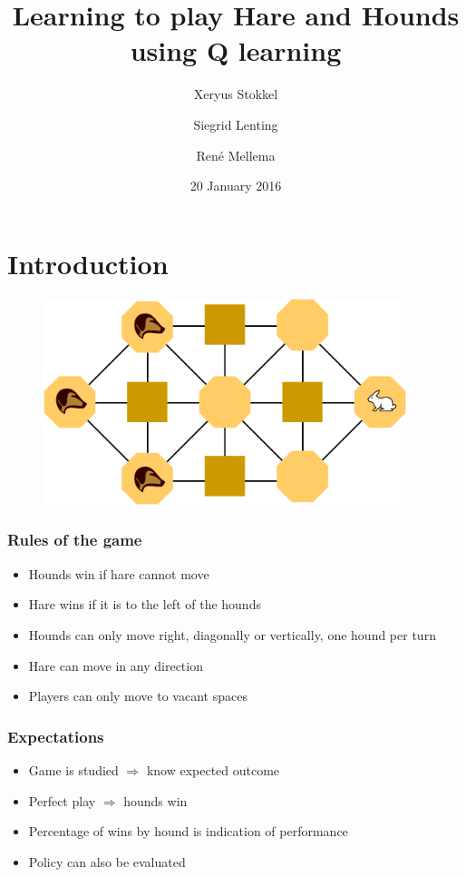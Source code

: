 \documentclass{beamer}
\title{Learning to play Hare and Hounds using Q learning}
\author{Xeryus Stokkel \and Siegrid Lenting \and Ren\'e Mellema}
\date{20 January 2016}
\begin{document}
\begin{frame}
    \maketitle
\end{frame}

\section{Introduction}
\begin{frame}
	\begin{figure}
		\centering
		\includegraphics[width=300pt]{Hare_and_Hounds_board.png}
		\label{fig:Hare_and_Hounds_board}
	\end{figure}		
\end{frame}

\begin{frame}
    \frametitle{Rules of the game}
    \begin{itemize}
        \item Hounds win if hare cannot move
        \item Hare wins if it is to the left of the hounds
        \item Hounds can only move right, diagonally or vertically, one hound per turn
        \item Hare can move in any direction
        \item Players can only move to vacant spaces
    \end{itemize}
\end{frame}

\begin{frame}
    \frametitle{Expectations}
    \begin{itemize}
        \item Game is studied $\Rightarrow$ know expected outcome
        \item Perfect play $\Rightarrow$ hounds win
        \item Percentage of wins by hound is indication of performance
        \item Policy can also be evaluated
    \end{itemize}
\end{frame}
\end{document}
